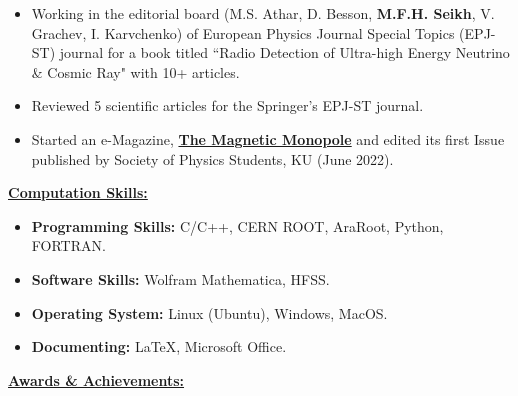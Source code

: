\documentclass[10pt]{report}
\begin{document}
\begin{itemize}
\item Working in the editorial board (M.S. Athar, D. Besson, {\bf M.F.H. Seikh}, V. Grachev, I. Karvchenko) of European Physics Journal Special Topics (EPJ-ST) journal for a book titled ``Radio Detection of Ultra-high Energy Neutrino \& Cosmic Ray" with 10+ articles.
\item Reviewed 5 scientific articles for the Springer's EPJ-ST journal.
\item Started an e-Magazine, \href{https://kansas-my.sharepoint.com/personal/m725s436_home_ku_edu/Documents/Attachments/SPS_e-Magazine_Issue1.pdf}{\bf The Magnetic Monopole} and edited its first Issue published by Society of Physics Students, KU (June 2022). 
\end{itemize}\vspace{2mm}\begin{large}
\textbf{\underline{Computation Skills:}}
\end{large}
\begin{itemize}
\item \textbf{Programming Skills:} C/C++, CERN ROOT, AraRoot, Python, FORTRAN.
\item \textbf{Software Skills:} Wolfram Mathematica, HFSS.
\item \textbf{Operating System:} Linux (Ubuntu), Windows, MacOS.
\item \textbf{Documenting:} \LaTeX, Microsoft Office.
\end{itemize}\begin{large}\vspace{2mm}
\textbf{\underline{Awards \& Achievements:}}
\end{large}
\end{document}
